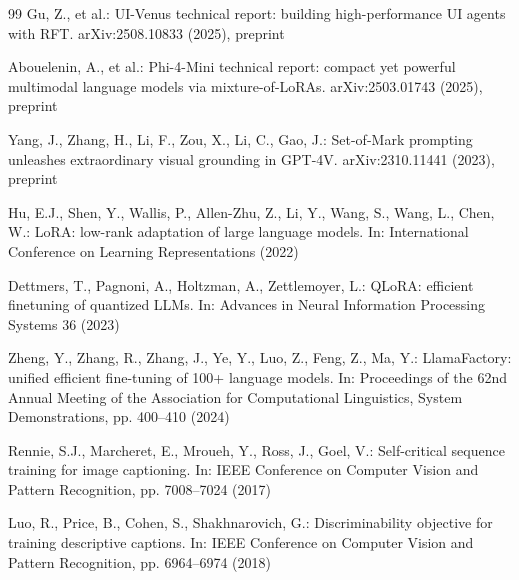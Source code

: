 \documentclass[runningheads,a4paper]{llncs}
\begin{document}
\begin{thebibliography}{99}
Gu, Z., et al.: UI-Venus technical report: building high-performance UI agents with RFT.
arXiv:2508.10833 (2025), preprint

Abouelenin, A., et al.: Phi-4-Mini technical report: compact yet powerful multimodal language
models via mixture-of-LoRAs. arXiv:2503.01743 (2025), preprint

Yang, J., Zhang, H., Li, F., Zou, X., Li, C., Gao, J.: Set-of-Mark prompting unleashes
extraordinary visual grounding in GPT-4V. arXiv:2310.11441 (2023), preprint

Hu, E.J., Shen, Y., Wallis, P., Allen-Zhu, Z., Li, Y., Wang, S., Wang, L., Chen, W.: LoRA:
low-rank adaptation of large language models. In: International Conference on Learning
Representations (2022)

Dettmers, T., Pagnoni, A., Holtzman, A., Zettlemoyer, L.: QLoRA: efficient finetuning of quantized
LLMs. In: Advances in Neural Information Processing Systems 36 (2023)

Zheng, Y., Zhang, R., Zhang, J., Ye, Y., Luo, Z., Feng, Z., Ma, Y.: LlamaFactory: unified efficient
fine-tuning of 100+ language models. In: Proceedings of the 62nd Annual Meeting of the Association
for Computational Linguistics, System Demonstrations, pp. 400--410 (2024)

Rennie, S.J., Marcheret, E., Mroueh, Y., Ross, J., Goel, V.: Self-critical sequence training for
image captioning. In: IEEE Conference on Computer Vision and Pattern Recognition,
pp. 7008--7024 (2017)

Luo, R., Price, B., Cohen, S., Shakhnarovich, G.: Discriminability objective for training
descriptive captions. In: IEEE Conference on Computer Vision and Pattern Recognition,
pp. 6964--6974 (2018)

\end{thebibliography}
\end{document}
